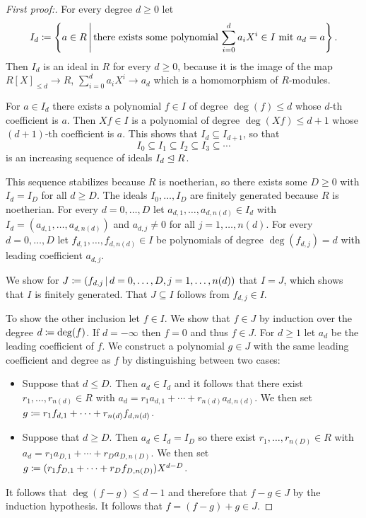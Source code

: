 \begin{proof}[First proof:]
  For every degree $d \geq 0$ let
  \[
              I_d
    \coloneqq \left\{
                a \in R
              \suchthat*
                \text{there exists some polynomial $\sum_{i=0}^d a_i X^i \in I$ mit $a_d = a$}
              \right\}.
  \]
  Then $I_d$ is an ideal in $R$ for every $d \geq 0$, because it is the image of the map $R[X]_{\leq d} \to R$, $\sum_{i=0}^d a_i X^i \to a_d$ which is a homomorphism of $R$-modules.
  
  For $a \in I_d$ there exists a polynomial $f \in I$ of degree $\deg(f) \leq d$ whose $d$-th coefficient is $a$.
  Then $Xf \in I$ is a polynomial of degree $\deg(Xf) \leq d+1$ whose $(d+1)$-th coefficient is $a$.
  This shows that $I_d \subseteq I_{d+1}$, so that
  \[
              I_0
    \subseteq I_1
    \subseteq I_2
    \subseteq I_3
    \subseteq \dotsb
  \]
  is an increasing sequence of ideals $I_d \trianglelefteq R$.
  
  This sequence stabilizes because $R$ is noetherian, so there exists some $D \geq 0$ with $I_d = I_D$ for all $d \geq D$.
  The ideals $I_0, \dotsc, I_D$ are finitely generated because $R$ is noetherian.
  For every $d = 0, \dotsc, D$ let $a_{d,1}, \dotsc, a_{d,n(d)} \in I_d$ with $I_d = (a_{d,1}, \dotsc, a_{d,n(d)})$ and $a_{d,j} \neq 0$ for all $j = 1, \dotsc, n(d)$.
  For every $d = 0, \dotsc, D$ let $f_{d,1}, \dotsc, f_{d,n(d)} \in I$ be polynomials of degree $\deg(f_{d,j}) = d$ with leading coefficient $a_{d,j}$.
  
  We show for $J \defined (f_{d,j} \suchthat d = 0, \dotsc, D, j = 1, \dotsc, n(d))$ that $I = J$, which shows that $I$ is finitely generated.
  That $J \subseteq I$ follows from $f_{d,j} \in I$.
  
  To show the other inclusion let $f \in I$.
  We show that $f \in J$ by induction over the degree $d \coloneqq \deg(f)$.
  If $d = -\infty$ then $f = 0$ and thus $f \in J$.
  For $d \geq 1$ let $a_d$ be the leading coefficient of $f$.
  We construct a polynomial $g \in J$ with the same leading coefficient and degree as $f$ by distinguishing between two cases:
  \begin{itemize}
    \item
      Suppose that $d \leq D$.
      Then $a_d \in I_d$ and it follows that there exist $r_1, \dotsc, r_{n(d)} \in R$ with $a_d = r_1 a_{d,1} + \dotsb + r_{n(d)} a_{d,n(d)}$.
      We then set $g \coloneqq r_1 f_{d,1} + \dotsb + r_{n(d)} f_{d,n(d)}$.
    \item
      Suppose that $d \geq D$.
      Then $a_d \in I_d = I_D$ so there exist $r_1, \dotsc, r_{n(D)} \in R$ with $a_d = r_1 a_{D,1} + \dotsb + r_D a_{D, n(D)}$.
      We then set $g \coloneqq (r_1 f_{D,1} + \dotsb + r_D f_{D,n(D)}) X^{d-D}$.
  \end{itemize}
  It follows that $\deg(f - g) \leq d - 1$ and therefore that $f - g \in J$ by the induction hypothesis.
  It follows that $f = (f - g) + g \in J$.
\end{proof}


